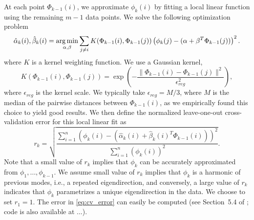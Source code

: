 At each point $\Phi_{k-1}(i)$, we approximate $\phi_k(i)$ by fitting a local linear function using the remaining $m-1$ data points.
%
We solve the following optimization problem
\begin{equation} \label{eq:opt_problem}
\hat{\alpha}_k (i) , \hat{\beta}_k(i)  = \operatorname*{arg\,min}_{\alpha, \beta} \sum_{j \ne i} K(\Phi_{k-1}(i), \Phi_{k-1}(j)) \left( \phi_{k}(j) - (\alpha + \beta^T \Phi_{k-1}(j)) \right)^2.
\end{equation}
%
where $K$ is a kernel weighting function.
%
We use a Gaussian kernel,
%
\begin{equation}
K(\Phi_{k-1}(i), \Phi_{k-1}(j))  = \exp \left( - \frac{\|\Phi_{k-1}(i) - \Phi_{k-1} (j) \|^2}{\epsilon_{reg}^2} \right),
\end{equation}
%
where $\epsilon_{reg}$ is the kernel scale.
%
We typically take $\epsilon_{reg} = M / 3$, where $M$ is the median of the pairwise distances between $\Phi_{k-1}(i)$, as we empirically found this choice to yield good results.
%
We then define the normalized leave-one-out cross-validation error for this local linear fit as
\begin{equation} \label{eq:cv_error}
r_{k} = \sqrt{ \frac{\sum_{i=1}^n \left( \phi_{k} (i) - (\hat{\alpha}_k(i) + \hat{\beta}_k(i)^T \Phi_{k-1}(i))  \right)^2} {\sum_{i=1}^n  \left( \phi_{k} (i) \right)^2 }}.
\end{equation}
%
Note that a small value of $r_k$ implies that $\phi_{k}$ can be accurately approximated from $\phi_1, \dots, \phi_{k-1}$.
%
We assume small value of $r_k$ implies that $\phi_k$ is a harmonic of previous modes, i.e., a repeated eigendirection, and conversely, a large value of $r_{k}$ indicates that $\phi_{k}$ parametrizes a unique eigendirection in the data.
%
We choose to set $r_1 = 1$.
%
The error in \eqref{eq:cv_error} can easily be computed (see Section~5.4 of \cite{wasserman2006all}; code is also available at ...).

